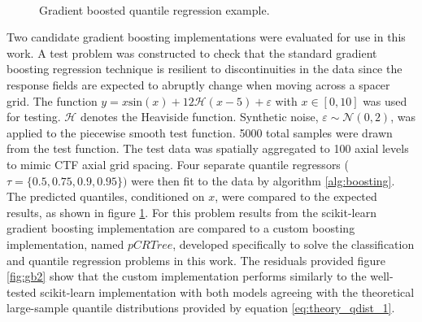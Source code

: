 

\begin{figure}[H]%
    \centering
    \hspace*{-1.0em}%
    \hspace*{-1.0em}%
    \\
    \hspace*{-1.0em}%
    \hspace*{-1.0em}%
    \caption[Gradient boosted quantile regression example.]{Gradient boosted quantile regression example.}%
    \label{fig:gb1}%
\end{figure}

Two candidate gradient boosting implementations were evaluated for use in this work.  A test problem was constructed to check that the standard gradient boosting regression technique is resilient to discontinuities in the data since the response fields are expected to abruptly change when moving across a spacer grid.  The function $y = x \mathrm{sin}(x) +12 \mathcal H(x-5)+\varepsilon$ with $x\in [0,10]$ was used for testing.  $\mathcal H$ denotes the Heaviside function. Synthetic noise, $\varepsilon \sim \mathcal N(0,2)$, was applied to the piecewise smooth test function.   5000 total samples were drawn from the test function. The test data was spatially aggregated to 100 axial levels to mimic CTF axial grid spacing.  Four separate quantile regressors ($\tau = \{0.5, 0.75, 0.9, 0.95 \})$ were then fit to the data by algorithm \ref{alg:boosting}. The predicted quantiles, conditioned on $x$, were compared to the expected results, as shown in figure \ref{fig:gb1}. For this problem results from the scikit-learn gradient boosting implementation are compared to a custom boosting implementation, named $pCRTree$, developed specifically to solve the classification and quantile regression problems in this work.  The residuals provided figure \ref{fig:gb2} show that the custom implementation performs similarly to the well-tested scikit-learn implementation with both models agreeing with the theoretical large-sample quantile distributions provided by equation \ref{eq:theory_qdist_1}.


